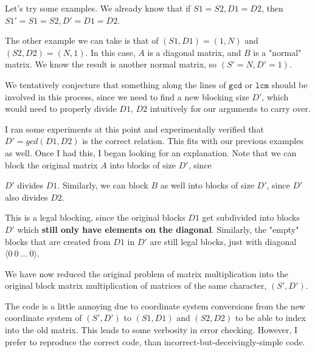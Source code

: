 \documentclass[11pt]{article}
\begin{document}
Let's try some examples. We already know that if $S1 = S2, D1 = D2$, then
$S1' = S1 = S2, D' = D1 = D2$.


The other example we can take is that of $(S1, D1) = (1, N)$ and $(S2, D2) =
(N, 1)$. In this case, $A$ is a diagonal matrix, and $B$ is a "normal" matrix.
We know the result is another normal matrix, so $(S' = N, D' = 1)$.


We tentatively conjecture that something along the lines of $\texttt{gcd}$
or $\texttt{lcm}$ should be involved in this process, since we need to find
a new blocking size $D'$, which would need to properly divide $D1$, $D2$
intuitively for our arguments to carry over.


I ran some experiments at this point and experimentally verified that
$D' = gcd(D1, D2)$ is the correct relation. This fits with our previous
examples as well. Once I had this, I began looking for an explanation.
Note that we can block the original matrix $A$ into blocks of size $D'$, since

$D'$ divides $D1$.  Similarly, we can block $B$ as well into blocks of size
$D'$, since $D'$ also divides $D2$.

This is a legal blocking, since the original blocks $D1$ get subdivided into
blocks $D'$ which \textbf{still only have elements on the diagonal}. Similarly,
the "empty" blocks that are created from $D1$ in $D'$ are still legal blocks,
just with diagonal $\langle 0~0~\dots~0 \rangle$.


We have now reduced the original problem of matrix multiplication into the
original block matrix multiplication of matrices of the same character, $(S', D')$.


\newpage
The code is a little annoying due to coordinate system conversions from the
new coordinate system of $(S', D')$ to $(S1, D1)$ and $(S2, D2)$ to be able
to index into the old matrix. This leads to some verbosity in error checking.
However, I prefer to reproduce the correct code, than
incorrect-but-deceivingly-simple code.
\end{document}
